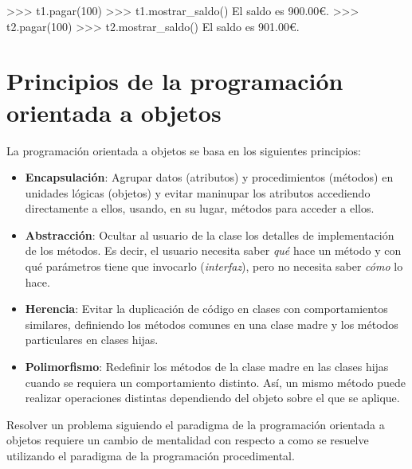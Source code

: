 \documentclass[
  spanish,
  a4paper,
]{scrreport}
\newenvironment{Shaded}{\begin{snugshade}}{\end{snugshade}}
\newcommand{\DecValTok}[1]{\textcolor[rgb]{0.68,0.00,0.00}{#1}}
\newcommand{\FloatTok}[1]{\textcolor[rgb]{0.68,0.00,0.00}{#1}}
\newcommand{\NormalTok}[1]{\textcolor[rgb]{0.00,0.23,0.31}{#1}}
\newcommand{\OperatorTok}[1]{\textcolor[rgb]{0.37,0.37,0.37}{#1}}
\providecommand{\tightlist}{%
  \setlength{\itemsep}{0pt}\setlength{\parskip}{0pt}}
\begin{document}
\begin{Shaded}
\begin{Highlighting}[]
\OperatorTok{\textgreater{}\textgreater{}\textgreater{}}\NormalTok{ t1.pagar(}\DecValTok{100}\NormalTok{)}
\OperatorTok{\textgreater{}\textgreater{}\textgreater{}}\NormalTok{ t1.mostrar\_saldo()}
\NormalTok{El saldo es }\FloatTok{900.00}\NormalTok{€.}
\OperatorTok{\textgreater{}\textgreater{}\textgreater{}}\NormalTok{ t2.pagar(}\DecValTok{100}\NormalTok{)}
\OperatorTok{\textgreater{}\textgreater{}\textgreater{}}\NormalTok{ t2.mostrar\_saldo()}
\NormalTok{El saldo es }\FloatTok{901.00}\NormalTok{€.}
\end{Highlighting}
\end{Shaded}

\section{Principios de la programación orientada a
objetos}\label{principios-de-la-programaciuxf3n-orientada-a-objetos}

La programación orientada a objetos se basa en los siguientes
principios:

\begin{itemize}
\tightlist
\item
  \textbf{Encapsulación}: Agrupar datos (atributos) y procedimientos
  (métodos) en unidades lógicas (objetos) y evitar maninupar los
  atributos accediendo directamente a ellos, usando, en su lugar,
  métodos para acceder a ellos.
\item
  \textbf{Abstracción}: Ocultar al usuario de la clase los detalles de
  implementación de los métodos. Es decir, el usuario necesita saber
  \emph{qué} hace un método y con qué parámetros tiene que invocarlo
  (\emph{interfaz}), pero no necesita saber \emph{cómo} lo hace.
\item
  \textbf{Herencia}: Evitar la duplicación de código en clases con
  comportamientos similares, definiendo los métodos comunes en una clase
  madre y los métodos particulares en clases hijas.
\item
  \textbf{Polimorfismo}: Redefinir los métodos de la clase madre en las
  clases hijas cuando se requiera un comportamiento distinto. Así, un
  mismo método puede realizar operaciones distintas dependiendo del
  objeto sobre el que se aplique.
\end{itemize}

Resolver un problema siguiendo el paradigma de la programación orientada
a objetos requiere un cambio de mentalidad con respecto a como se
resuelve utilizando el paradigma de la programación procedimental.
\end{document}
